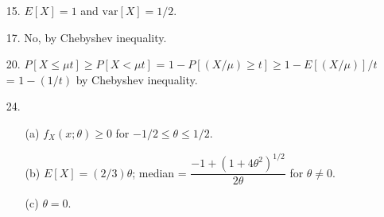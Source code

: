 \begin{enumerate}
	\item[15.] $E[X]=1$ and $\text{var}[X]= 1/2$.
	
	\item[17.] No, by Chebyshev inequality.
	
	\item[20.] $P[X\le \mu t] \ge P[X < \mu t]$ = $1-P[(X/\mu) \ge t] \ge 1 - E[(X/\mu)]/t$ = $ 1- (1/t)$ by Chebyshev inequality. 
	
	\item[24.] \begin{enumerate}
		\item[(a)] $f_X(x;\theta) \ge 0$ for $-1/2 \le \theta \le 1/2$. 
		\item[(b)] $E[X] = (2/3)\theta$; median = $ \dfrac{-1+(1+4\theta^2)^{1/2}}{2\theta}$ for $\theta \ne 0$.
		\item[(c)] $\theta = 0$.
	\end{enumerate} 

\end{enumerate} 
